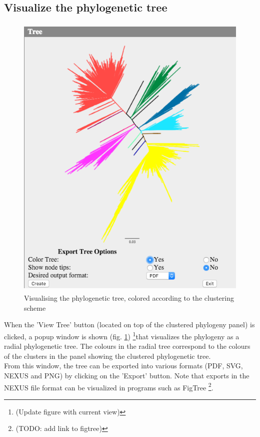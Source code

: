 \documentclass[a4paper, 11pt]{article} %
\begin{document}
\subsection{Visualize the phylogenetic tree}
\begin{figure}[H]
\centering
\includegraphics[width=400pt, height=400pt, keepaspectratio=true]{images/view_tree.PNG}
\caption{Visualising the phylogenetic tree, colored according to the clustering scheme}
\label{fig:view_tree}
\end{figure}

When the 'View Tree' button (located on top of the clustered phylogeny panel) is clicked, a popup window is shown (fig. \ref{fig:view_tree}) \footnote{(Update figure with current view)}that visualizes the phylogeny as a radial phylogenetic tree. The colours in the radial tree correspond to the colours of the clusters in the panel showing the clustered phylogenetic tree.
\\
From this window, the tree can be exported into various formats (PDF, SVG, NEXUS and PNG) by clicking on the 'Export' button. Note that exports in the NEXUS file format can be visualized in programs such as FigTree \footnote{(TODO: add link to figtree)}.  
\end{document}
